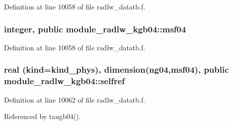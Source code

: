 Definition at line 10058 of file radlw\+\_\+datatb.\+f.

\subsubsection[{\texorpdfstring{msf04}{msf04}}]{\setlength{\rightskip}{0pt plus 5cm}integer, public module\+\_\+radlw\+\_\+kgb04\+::msf04}\hypertarget{namespacemodule__radlw__kgb04_a4b38dd1165aca80e19697df7ae74a27a}{}\label{namespacemodule__radlw__kgb04_a4b38dd1165aca80e19697df7ae74a27a}


Definition at line 10058 of file radlw\+\_\+datatb.\+f.

\subsubsection[{\texorpdfstring{selfref}{selfref}}]{\setlength{\rightskip}{0pt plus 5cm}real (kind=kind\+\_\+phys), dimension(ng04,{\bf msf04}), public module\+\_\+radlw\+\_\+kgb04\+::selfref}\hypertarget{namespacemodule__radlw__kgb04_a696b91ef86ccbda17df10f770797cafa}{}\label{namespacemodule__radlw__kgb04_a696b91ef86ccbda17df10f770797cafa}


Definition at line 10062 of file radlw\+\_\+datatb.\+f.



Referenced by taugb04().

